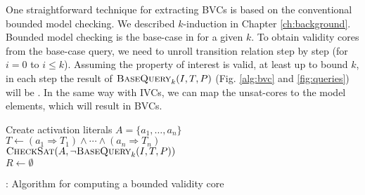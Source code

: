 One straightforward technique for extracting BVCs is based on the conventional bounded model checking.
We described $k$-induction in Chapter \ref{ch:background}. Bounded model checking is the base-case in \label{fig:k-induction} for a given $k$. To obtain validity cores from the base-case query, we need to unroll transition relation step by step (for $i=0$ to $i \leq k$). Assuming the property of interest is valid, at least up to bound $k$, in each step the result of $\textsc{BaseQuery}_k(I, T, P)$ (Fig. \ref{alg:bvc} and \ref{fig:queries}) will be \unsat . In the same way with IVCs, we can map the unsat-cores to the model elements, which will result in BVCs.

\begin{algorithm}[t]
  \BlankLine 
   Create activation literals $A = \{a_1, \ldots, a_n\}$ \\
  $T \leftarrow (a_1 \Rightarrow T_1) \land \cdots \land (a_n \Rightarrow T_n)$ \\
  $\textsc{CheckSat}(A, \neg\textsc{BaseQuery}_k(I, T, P))$ \\
  $R \leftarrow \emptyset$ \\
\caption{\bvcalg: Algorithm for computing a bounded validity core}
\label{alg:bvc}
\end{algorithm} 